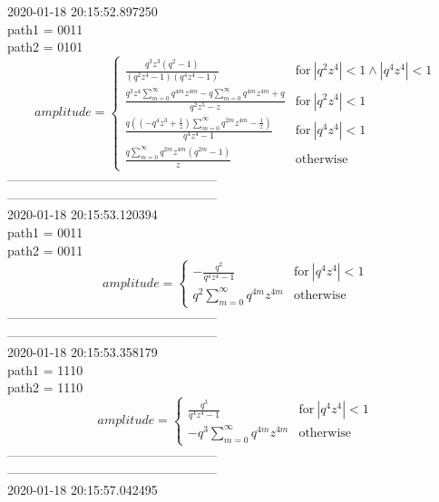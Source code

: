 2020-01-18 20:15:52.897250\\
path1 = 0011\\
path2 = 0101\\
$$amplitude = \begin{cases} \frac{q^{3} z^{3} \left(q^{2} - 1\right)}{\left(q^{2} z^{4} - 1\right) \left(q^{4} z^{4} - 1\right)} & \text{for}\: \left|{q^{2} z^{4}}\right| < 1 \wedge \left|{q^{4} z^{4}}\right| < 1 \\\frac{q^{3} z^{4} \sum_{m=0}^{\infty} q^{4 m} z^{4 m} - q \sum_{m=0}^{\infty} q^{4 m} z^{4 m} + q}{q^{2} z^{5} - z} & \text{for}\: \left|{q^{2} z^{4}}\right| < 1 \\\frac{q \left(\left(- q^{4} z^{3} + \frac{1}{z}\right) \sum_{m=0}^{\infty} q^{2 m} z^{4 m} - \frac{1}{z}\right)}{q^{4} z^{4} - 1} & \text{for}\: \left|{q^{4} z^{4}}\right| < 1 \\\frac{q \sum_{m=0}^{\infty} q^{2 m} z^{4 m} \left(q^{2 m} - 1\right)}{z} & \text{otherwise} \end{cases}$$
--------------------------------------------------\\
--------------------------------------------------\\
2020-01-18 20:15:53.120394\\
path1 = 0011\\
path2 = 0011\\
$$amplitude = \begin{cases} - \frac{q^{2}}{q^{4} z^{4} - 1} & \text{for}\: \left|{q^{4} z^{4}}\right| < 1 \\q^{2} \sum_{m=0}^{\infty} q^{4 m} z^{4 m} & \text{otherwise} \end{cases}$$
--------------------------------------------------\\
--------------------------------------------------\\
2020-01-18 20:15:53.358179\\
path1 = 1110\\
path2 = 1110\\
$$amplitude = \begin{cases} \frac{q^{3}}{q^{4} z^{4} - 1} & \text{for}\: \left|{q^{4} z^{4}}\right| < 1 \\- q^{3} \sum_{m=0}^{\infty} q^{4 m} z^{4 m} & \text{otherwise} \end{cases}$$
--------------------------------------------------\\
--------------------------------------------------\\
2020-01-18 20:15:57.042495\\
